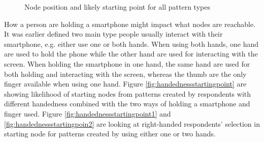   \begin{figure}[H]
    \centering
    \hspace{0.7cm}
    \caption{Node position and likely starting point for all pattern types}
    \label{fig:startingNode4}
  \end{figure}

  How a person are holding a smartphone might impact what nodes are reachable. It was earlier defined two main type people usually interact with their smartphone, e.g. either use one or both hands. When using both hands, one hand are used to hold the phone while the other hand are used for interacting with the screen. When holding the smartphone in one hand, the same hand are used for both holding and interacting with the screen, whereas the thumb are the only finger available when using one hand. Figure \ref{fig:handednessstartingpoint} are showing likelihood of starting nodes from patterns created by respondents with different handedness combined with the two ways of holding a smartphone and finger used. Figure \ref{fig:handednessstartingpoint1} and \ref{fig:handednessstartingpoin2} are looking at right-handed respondents' selection in starting node for patterns created by using either one or two hands. 

